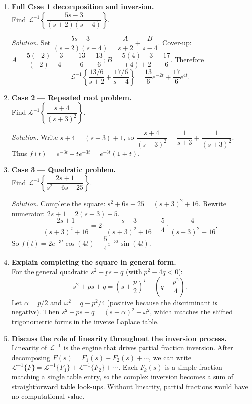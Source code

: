 \documentclass[12pt,a4paper]{article}
\begin{document}
\begin{enumerate}[leftmargin=*, label=\textbf{D\arabic*.}]

\item \textbf{Full Case 1 decomposition and inversion.}\\
    Find $\mathcal{L}^{-1}\!\left\{\dfrac{5s-3}{(s+2)(s-4)}\right\}$.

    \textit{Solution.}
    Set $\dfrac{5s-3}{(s+2)(s-4)} = \dfrac{A}{s+2}+\dfrac{B}{s-4}$.
    Cover-up: $A = \dfrac{5(-2)-3}{(-2)-4} = \dfrac{-13}{-6} = \dfrac{13}{6}$;
    $B = \dfrac{5(4)-3}{(4)+2} = \dfrac{17}{6}$.
    Therefore
    \[
        \mathcal{L}^{-1}\!\left\{\frac{13/6}{s+2}+\frac{17/6}{s-4}\right\}
        = \frac{13}{6}e^{-2t}+\frac{17}{6}e^{4t}.
    \]

\item \textbf{Case 2 --- Repeated root problem.}\\
    Find $\mathcal{L}^{-1}\!\left\{\dfrac{s+4}{(s+3)^{2}}\right\}$.

    \textit{Solution.}
    Write $s+4 = (s+3)+1$, so
    $\dfrac{s+4}{(s+3)^{2}} = \dfrac{1}{s+3}+\dfrac{1}{(s+3)^{2}}$.
    Thus $f(t) = e^{-3t}+te^{-3t} = e^{-3t}(1+t)$.

\item \textbf{Case 3 --- Quadratic problem.}\\
    Find $\mathcal{L}^{-1}\!\left\{\dfrac{2s+1}{s^{2}+6s+25}\right\}$.

    \textit{Solution.}
    Complete the square: $s^{2}+6s+25 = (s+3)^{2}+16$.
    Rewrite numerator: $2s+1 = 2(s+3)-5$.
    \[
        \frac{2s+1}{(s+3)^{2}+16}
        = 2\cdot\frac{s+3}{(s+3)^{2}+16}
          - \frac{5}{4}\cdot\frac{4}{(s+3)^{2}+16}.
    \]
    So $f(t) = 2e^{-3t}\cos(4t) - \dfrac{5}{4}e^{-3t}\sin(4t)$.

\item \textbf{Explain completing the square in general form.}\\
    For the general quadratic $s^{2}+ps+q$ (with $p^{2}-4q < 0$):
    \[
        s^{2}+ps+q = \left(s+\frac{p}{2}\right)^{2} + \left(q - \frac{p^{2}}{4}\right).
    \]
    Let $\alpha = p/2$ and $\omega^{2} = q - p^{2}/4$ (positive because the
    discriminant is negative).  Then
    $s^{2}+ps+q = (s+\alpha)^{2}+\omega^{2}$, which matches the shifted
    trigonometric forms in the inverse Laplace table.

\item \textbf{Discuss the role of linearity throughout the inversion process.}\\
    Linearity of $\mathcal{L}^{-1}$ is the engine that drives partial fraction
    inversion.  After decomposing $F(s) = F_1(s)+F_2(s)+\cdots$, we can write
    $\mathcal{L}^{-1}\{F\} = \mathcal{L}^{-1}\{F_1\}+\mathcal{L}^{-1}\{F_2\}+\cdots$.
    Each $F_k(s)$ is a simple fraction matching a single table entry, so the
    complex inversion becomes a sum of straightforward table look-ups.
    Without linearity, partial fractions would have no computational value.

\end{enumerate}
\end{document}
